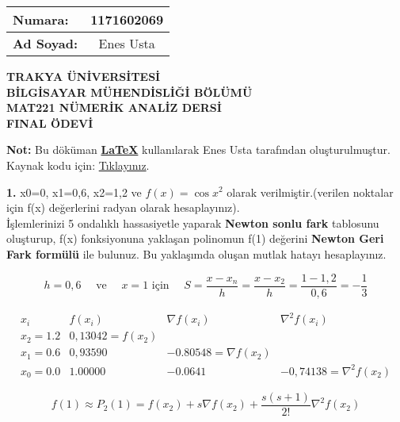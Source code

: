 \documentclass[a4paper,10pt]{article}
\begin{document}
  \begin{tabular}{ | l  c | }
    \hline
    \textbf{Numara:} & 1171602069 \\ \hline
    \textbf{Ad Soyad:} & Enes Usta \\
    \hline
  \end{tabular}

\begin{center}
\textbf{TRAKYA ÜNİVERSİTESİ} \\
\textbf{BİLGİSAYAR MÜHENDİSLİĞİ BÖLÜMÜ} \\
\textbf{MAT221 NÜMERİK ANALİZ DERSİ} \\
\textbf{FINAL ÖDEVİ}
\end{center}

\begin{center}
\textbf{Not:} Bu döküman \href{https://en.wikipedia.org/wiki/LaTeX}{\textbf{LaTeX}} kullanılarak Enes Usta tarafından oluşturulmuştur.
Kaynak kodu için: \href{https://github.com/enesusta/bahar-donemi-final/blob/master/numerik-analiz-final.tex}{Tıklayınız}.
\end{center}

\textbf{1.} x0=0, x1=0,6, x2=1,2 ve \textbf{$f(x)=\cos x^{2}$} olarak verilmiştir.(verilen noktalar için f(x)
değerlerini radyan olarak hesaplayınız).\\İşlemlerinizi 5 ondalıklı hassasiyetle yaparak
\textbf{Newton sonlu fark} tablosunu oluşturup, f(x) fonksiyonuna yaklaşan polinomun f(1)
değerini \textbf{Newton Geri Fark formülü} ile bulunuz. Bu yaklaşımda oluşan mutlak hatayı
hesaplayınız.

\vspace{0.5cm}

$$h=0,6 \quad \text { ve } \quad x=1 \text { için } \quad S=\frac{x-x_{n}}{h}=\frac{x-x_{2}}{h}=\frac{1-1,2}{0,6}=-\frac{1}{3}$$

$$\begin{array}{llll}
x_{i} & f\left(x_{i}\right) & \nabla f\left(x_{i}\right) & \nabla^{2} f\left(x_{i}\right) \\
\hline x_{2}=1.2 & 0,13042=f\left(x_{2}\right) & & \\
x_{1}=0.6 & 0,93590 & -0.80548=\nabla f\left(x_{2}\right) & \\
x_{0}=0.0 & 1.00000 & -0.0641 & -0,74138=\nabla^{2} f\left(x_{2}\right)
\end{array}$$

\vspace{0.8cm}

$$f(1) \approx P_{2}(1)=f\left(x_{2}\right)+s \nabla f\left(x_{2}\right)+\frac{s(s+1)}{2 !} \nabla^{2} f\left(x_{2}\right)$$
\end{document}

